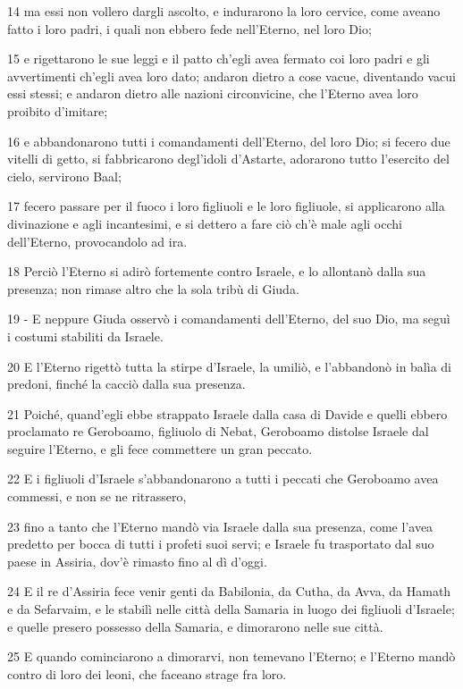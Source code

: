 \par 14 ma essi non vollero dargli ascolto, e indurarono la loro cervice, come aveano fatto i loro padri, i quali non ebbero fede nell'Eterno, nel loro Dio;
\par 15 e rigettarono le sue leggi e il patto ch'egli avea fermato coi loro padri e gli avvertimenti ch'egli avea loro dato; andaron dietro a cose vacue, diventando vacui essi stessi; e andaron dietro alle nazioni circonvicine, che l'Eterno avea loro proibito d'imitare;
\par 16 e abbandonarono tutti i comandamenti dell'Eterno, del loro Dio; si fecero due vitelli di getto, si fabbricarono degl'idoli d'Astarte, adorarono tutto l'esercito del cielo, servirono Baal;
\par 17 fecero passare per il fuoco i loro figliuoli e le loro figliuole, si applicarono alla divinazione e agli incantesimi, e si dettero a fare ciò ch'è male agli occhi dell'Eterno, provocandolo ad ira.
\par 18 Perciò l'Eterno si adirò fortemente contro Israele, e lo allontanò dalla sua presenza; non rimase altro che la sola tribù di Giuda.
\par 19 - E neppure Giuda osservò i comandamenti dell'Eterno, del suo Dio, ma seguì i costumi stabiliti da Israele.
\par 20 E l'Eterno rigettò tutta la stirpe d'Israele, la umiliò, e l'abbandonò in balìa di predoni, finché la cacciò dalla sua presenza.
\par 21 Poiché, quand'egli ebbe strappato Israele dalla casa di Davide e quelli ebbero proclamato re Geroboamo, figliuolo di Nebat, Geroboamo distolse Israele dal seguire l'Eterno, e gli fece commettere un gran peccato.
\par 22 E i figliuoli d'Israele s'abbandonarono a tutti i peccati che Geroboamo avea commessi, e non se ne ritrassero,
\par 23 fino a tanto che l'Eterno mandò via Israele dalla sua presenza, come l'avea predetto per bocca di tutti i profeti suoi servi; e Israele fu trasportato dal suo paese in Assiria, dov'è rimasto fino al dì d'oggi.
\par 24 E il re d'Assiria fece venir genti da Babilonia, da Cutha, da Avva, da Hamath e da Sefarvaim, e le stabilì nelle città della Samaria in luogo dei figliuoli d'Israele; e quelle presero possesso della Samaria, e dimorarono nelle sue città.
\par 25 E quando cominciarono a dimorarvi, non temevano l'Eterno; e l'Eterno mandò contro di loro dei leoni, che faceano strage fra loro.
